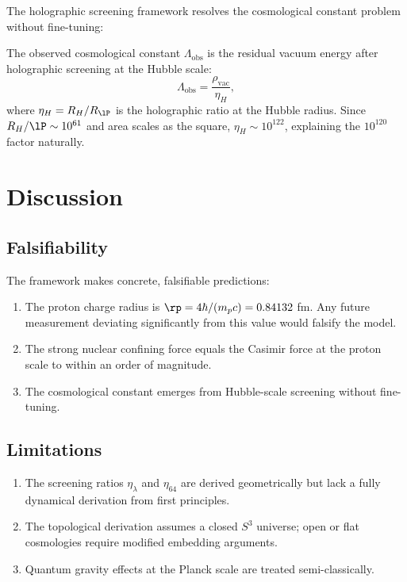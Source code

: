 \documentclass[12pt, a4paper]{article}
\theoremstyle{plain}
\theoremstyle{definition}
\begin{document}
The holographic screening framework resolves the cosmological constant
problem without fine-tuning:

\begin{proposition}\label{prop:cc}
  The observed cosmological constant $\Lambda_{\text{obs}}$ is the residual
  vacuum energy after holographic screening at the Hubble scale:
  \begin{equation}
    \Lambda_{\text{obs}} = \frac{\rho_{\text{vac}}}{\eta_H},
  \end{equation}
  where $\eta_H = R_H / R_{\lP}$ is the holographic ratio at the Hubble
  radius. Since $R_H / \lP \sim 10^{61}$ and area scales as the square,
  $\eta_H \sim 10^{122}$, explaining the $10^{120}$ factor naturally.
\end{proposition}

\section{Discussion}\label{sec:discussion}

\subsection{Falsifiability}

The framework makes concrete, falsifiable predictions:
\begin{enumerate}
  \item The proton charge radius is $\rp = 4\hbar/(m_p c) = 0.84132$ fm.
    Any future measurement deviating significantly from this value would
    falsify the model.
  \item The strong nuclear confining force equals the Casimir force at the
    proton scale to within an order of magnitude.
  \item The cosmological constant emerges from Hubble-scale screening
    without fine-tuning.
\end{enumerate}

\subsection{Limitations}

\begin{enumerate}
  \item The screening ratios $\eta_\lambda$ and $\eta_{64}$ are derived
    geometrically but lack a fully dynamical derivation from first principles.
  \item The topological derivation assumes a closed $S^3$ universe; open
    or flat cosmologies require modified embedding arguments.
  \item Quantum gravity effects at the Planck scale are treated
    semi-classically.
\end{enumerate}
\end{document}

